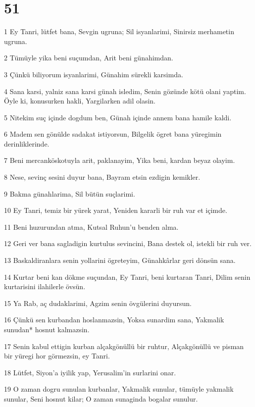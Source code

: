 \chapter{51}

\par 1 Ey Tanri, lütfet bana, Sevgin ugruna; Sil isyanlarimi, Sinirsiz merhametin ugruna.
\par 2 Tümüyle yika beni suçumdan, Arit beni günahimdan.
\par 3 Çünkü biliyorum isyanlarimi, Günahim sürekli karsimda.
\par 4 Sana karsi, yalniz sana karsi günah isledim, Senin gözünde kötü olani yaptim. Öyle ki, konusurken hakli, Yargilarken adil olasin.
\par 5 Nitekim suç içinde dogdum ben, Günah içinde annem bana hamile kaldi.
\par 6 Madem sen gönülde sadakat istiyorsun, Bilgelik ögret bana yüregimin derinliklerinde.
\par 7 Beni mercanköskotuyla arit, paklanayim, Yika beni, kardan beyaz olayim.
\par 8 Nese, sevinç sesini duyur bana, Bayram etsin ezdigin kemikler.
\par 9 Bakma günahlarima, Sil bütün suçlarimi.
\par 10 Ey Tanri, temiz bir yürek yarat, Yeniden kararli bir ruh var et içimde.
\par 11 Beni huzurundan atma, Kutsal Ruhun'u benden alma.
\par 12 Geri ver bana sagladigin kurtulus sevincini, Bana destek ol, istekli bir ruh ver.
\par 13 Baskaldiranlara senin yollarini ögreteyim, Günahkârlar geri dönsün sana.
\par 14 Kurtar beni kan dökme suçundan, Ey Tanri, beni kurtaran Tanri, Dilim senin kurtarisini ilahilerle övsün.
\par 15 Ya Rab, aç dudaklarimi, Agzim senin övgülerini duyursun.
\par 16 Çünkü sen kurbandan hoslanmazsin, Yoksa sunardim sana, Yakmalik sunudan* hosnut kalmazsin.
\par 17 Senin kabul ettigin kurban alçakgönüllü bir ruhtur, Alçakgönüllü ve pisman bir yüregi hor görmezsin, ey Tanri.
\par 18 Lütfet, Siyon'a iyilik yap, Yerusalim'in surlarini onar.
\par 19 O zaman dogru sunulan kurbanlar, Yakmalik sunular, tümüyle yakmalik sunular, Seni hosnut kilar; O zaman sunaginda bogalar sunulur.

